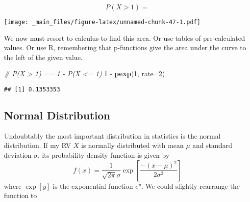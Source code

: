 \documentclass[]{book}
\newenvironment{Shaded}{\begin{snugshade}}{\end{snugshade}}
\newcommand{\KeywordTok}[1]{\textcolor[rgb]{0.13,0.29,0.53}{\textbf{{#1}}}}
\newcommand{\DataTypeTok}[1]{\textcolor[rgb]{0.13,0.29,0.53}{{#1}}}
\newcommand{\DecValTok}[1]{\textcolor[rgb]{0.00,0.00,0.81}{{#1}}}
\newcommand{\StringTok}[1]{\textcolor[rgb]{0.31,0.60,0.02}{{#1}}}
\newcommand{\CommentTok}[1]{\textcolor[rgb]{0.56,0.35,0.01}{\textit{{#1}}}}
\newcommand{\NormalTok}[1]{{#1}}
\begin{document}
\[P(X>1)=\]

\begin{Shaded}
\end{Shaded}

\texttt{[image: \_main\_files/figure-latex/unnamed-chunk-47-1.pdf]}

We now must resort to calculus to find this area. Or use tables of
pre-calculated values. Or use R, remembering that p-functions give the
area under the curve to the left of the given value.

\begin{Shaded}
\begin{Highlighting}[]
\CommentTok{# P(X > 1)  == 1 - P(X <= 1)}
\DecValTok{1} \NormalTok{-}\StringTok{ }\KeywordTok{pexp}\NormalTok{(}\DecValTok{1}\NormalTok{, }\DataTypeTok{rate=}\DecValTok{2}\NormalTok{)}
\end{Highlighting}
\end{Shaded}

\begin{verbatim}
## [1] 0.1353353
\end{verbatim}

\subsection{Normal Distribution}\label{normal-distribution}

Undoubtably the most important distribution in statistics is the normal
distribution. If my RV \(X\) is normally distributed with mean \(\mu\)
and standard deviation \(\sigma\), its probability density function is
given by
\[f(x)=\frac{1}{\sqrt{2\pi}\sigma}\exp\left[\frac{-(x-\mu)^{2}}{2\sigma^{2}}\right]\]
where \(\exp[y]\) is the exponential function \(e^{y}\). We could
slightly rearrange the function to
\end{document}
